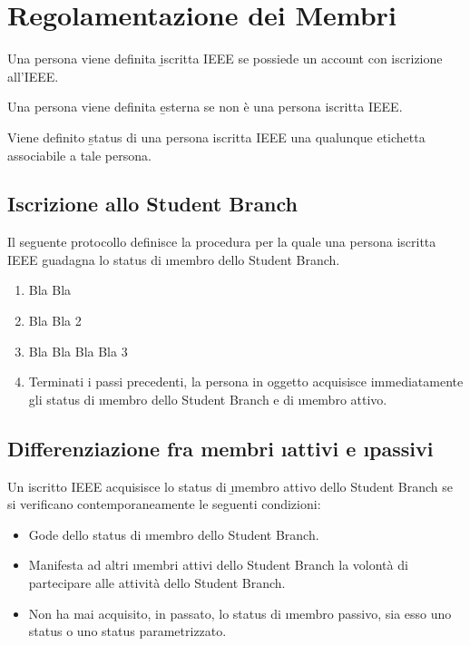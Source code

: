 \section{Regolamentazione dei Membri}

\begin{defn}
	Una persona viene definita \b{iscritta IEEE} se possiede un account con iscrizione all'IEEE.
\end{defn}

\begin{defn}[Esterno]
	Una persona viene definita \b{esterna} se non è una persona iscritta IEEE.
\end{defn}

\begin{defn}[Status]
	Viene definito \b{status} di una persona iscritta IEEE una qualunque etichetta associabile a tale persona.
\end{defn}

\subsection{Iscrizione allo Student Branch}

\begin{prot}
	\label{Iscrizione allo Student Branch IEEE}
	Il seguente protocollo definisce la procedura per la quale una persona iscritta IEEE guadagna lo status di \i{membro dello Student Branch}.
	\begin{enumerate}
		\item Bla Bla
		\item Bla Bla 2
		\item Bla Bla Bla Bla 3
		\item Terminati i passi precedenti, la persona in oggetto acquisisce immediatamente gli status di \i{membro dello Student Branch} e di \i{membro attivo}.
	\end{enumerate}
\end{prot}

\subsection{Differenziazione fra membri \i{attivi} e \i{passivi}}


\begin{regl}
	Un iscritto IEEE acquisisce lo status di \b{\i{membro attivo}} dello Student Branch se si verificano contemporaneamente le seguenti condizioni:
	\begin{itemize}
		\item Gode dello status di \i{membro dello Student Branch}.
		\item Manifesta ad altri \i{membri attivi} dello Student Branch la volontà di partecipare alle attività dello Student Branch.
		\item Non ha mai acquisito, in passato, lo status di \i{membro passivo}, sia esso uno status o uno status parametrizzato.
	\end{itemize}
\end{regl}

